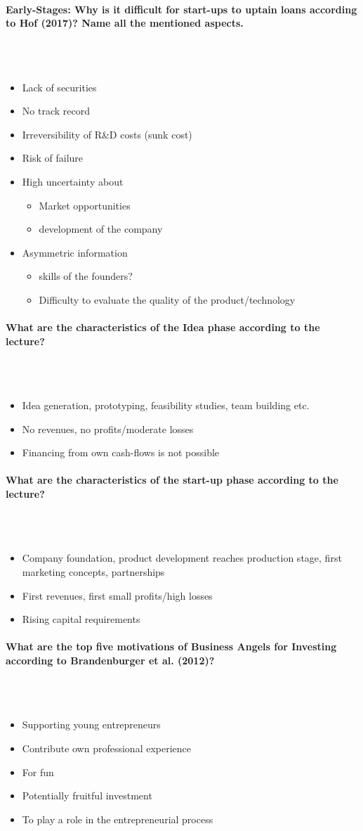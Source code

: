 \documentclass[10pt,a4paper,noendnumber=true]{scrartcl}
\newcommand{\properparagraph}[1]{\paragraph{\textcolor{Emerald}{#1}}\mbox{}\\}
\begin{document}
\properparagraph{Early-Stages: Why is it difficult for start-ups to uptain loans according to Hof (2017)? Name all the mentioned aspects.}
\\[-6ex]
\begin{itemize}
	\item Lack of securities
	\item No track record
	\item Irreversibility of R\&D costs (sunk cost)
	\item Risk of failure
	\item High uncertainty about
	\begin{itemize}
		\item Market opportunities
		\item development of the company
	\end{itemize}
	\item Asymmetric information
	\begin{itemize}
		\item skills of the founders?  
		\item Difficulty to evaluate the quality of the product/technology
	\end{itemize}
\end{itemize}


\properparagraph{What are the characteristics of the Idea phase according to the lecture?}
\\[-6ex]
\begin{itemize}
	\item Idea generation, prototyping, feasibility studies, team	building etc.
	\item No revenues, no profits/moderate losses
	\item Financing from own cash-flows is not possible
\end{itemize}


\properparagraph{What are the characteristics of the start-up phase according to the lecture?}
\\[-6ex]
\begin{itemize}
	\item Company foundation, product development reaches production stage, first marketing concepts, partnerships
	\item First revenues, first small profits/high losses
	\item Rising capital requirements
\end{itemize}


\properparagraph{What are the top five motivations of Business Angels for Investing according to Brandenburger et al. (2012)?}
\\[-6ex]
\begin{itemize}
	\item Supporting young entrepreneurs
	\item Contribute own professional experience
	\item For fun
	\item Potentially fruitful investment
	\item To play a role in the entrepreneurial process	
\end{itemize}
\end{document}
